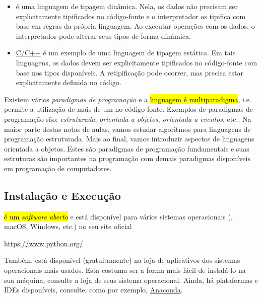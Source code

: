 \begin{itemize}
\item {}

  {\python} é uma linguagem de tipagem dinâmica. Nela, os dados não precisam ser explicitamente tipificados no código-fonte e o interpretador os tipifica com base em regras da própria linguagem. Ao executar operações com os dados, o interpretador pode alterar seus tipos de forma dinâmica.

\item {}

  \href{https://pt.wikipedia.org/wiki/C\%2B\%2B}{C/C++} é um exemplo de uma linguagem de tipagem estática. Em tais linguagens, os dados devem ser explicitamente tipificados no código-fonte com base nos tipos disponíveis. A retipificação pode ocorrer, mas precisa estar explicitamente definida no código.
\end{itemize}

Existem vários \emph{paradigmas de programação} e a \hl{linguagem {\python} é multiparadigma}, i.e. permite a utilização de mais de um no código-fonte. Exemplos de paradigmas de programação são: \emph{estruturada}, \emph{orientada a objetos}, \emph{orientada a eventos}, etc.. Na maior parte destas notas de aulas, vamos estudar algoritmos para linguagens de programação estruturada. Mais ao final, vamos introduzir aspectos de linguagens orientada a objetos. Estes são paradigmas de programação fundamentais e suas estruturas são importantes na programação com demais paradigmas disponíveis em programação de computadores.

\subsection{Instalação e Execução}

\hl{{\python} é um \emph{software aberto}} e está disponível para vários sistemas operacionais ({\linux}, macOS, Windows, etc.) no seu site oficial
\begin{center}
  \url{https://www.python.org/}
\end{center}
Também, está disponível (gratuitamente) na loja de aplicativos dos sistemas operacionais mais usados. Esta costuma ser a forma mais fácil de instalá-lo na sua máquina, consulte a loja de seus sistema operacional. Ainda, há plataformas e IDEs {\python} disponíveis, consulte, como por exemplo, \href{https://www.anaconda.com/}{Anaconda}.


